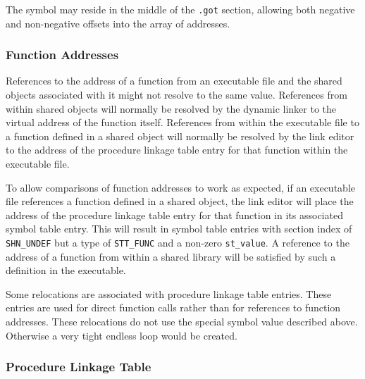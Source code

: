 The symbol  may reside in the
middle of the {\tt .got} section, allowing both negative and
non-negative offsets into the array of addresses.

\subsubsection{Function Addresses}
\label{function_addresses}

References to the address of a function from an executable
file and the shared objects associated with it might not resolve to
the same value. References from within shared objects will normally be
resolved by the dynamic linker to the virtual address of the function
itself. References from within the executable file to a function
defined in a shared object will normally be resolved by the link
editor to the address of the procedure linkage table entry for that
function within the executable file.

To allow comparisons of function addresses to work as expected, if an
executable file references a function defined in a shared object, the
link editor will place the address of the procedure linkage table
entry for that function in its associated symbol table entry. This
will result in symbol table entries with section index of {\tt SHN_UNDEF}
but a type of {\tt STT_FUNC} and a non-zero {\tt st_value}.  A reference to the
address of a function from within a shared library will be satisfied
by such a definition in the executable.

Some relocations are associated with procedure linkage table
entries. These entries are used for direct function calls rather than
for references to function addresses. These relocations do not use the special
symbol value described above. Otherwise a very tight endless loop
would be created.

\subsubsection{Procedure Linkage Table}
\label{plt}



